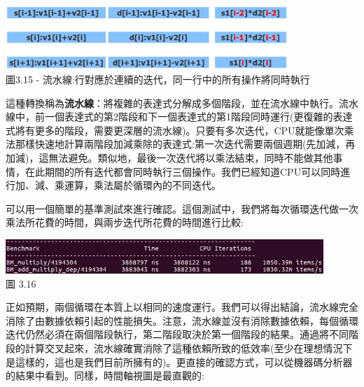 \begin{center}
\includegraphics[width=0.8\textwidth]{content/1/chapter3/images/15.jpg}\\
圖3.15 - 流水線:行對應於連續的迭代，同一行中的所有操作將同時執行
\end{center}

這種轉換稱為\textbf{流水線}：將複雜的表達式分解成多個階段，並在流水線中執行。流水線中，前一個表達式的第2階段和下一個表達式的第1階段同時運行(更復雜的表達式將有更多的階段，需要更深層的流水線)。只要有多次迭代，CPU就能像單次乘法那樣快速地計算兩階段加減乘除的表達式:第一次迭代需要兩個週期(先加減，再加減)，這無法避免。類似地，最後一次迭代將以乘法結束，同時不能做其他事情，在此期間的所有迭代都會同時執行三個操作。我們已經知道CPU可以同時進行加、減、乘運算，乘法屬於循環內的不同迭代。

可以用一個簡單的基準測試來進行確認。這個測試中，我們將每次循環迭代做一次乘法所花費的時間，與兩步迭代所花費的時間進行比較:

\begin{center}
\includegraphics[width=0.9\textwidth]{content/1/chapter3/images/16.jpg}\\
圖 3.16
\end{center}

正如預期，兩個循環在本質上以相同的速度運行。我們可以得出結論，流水線完全消除了由數據依賴引起的性能損失。注意，流水線並沒有消除數據依賴，每個循環迭代仍然必須在兩個階段執行，第二階段取決於第一個階段的結果。通過將不同階段的計算交叉起來，流水線確實消除了這種依賴所致的低效率(至少在理想情況下是這樣的，這也是我們目前所擁有的)。更直接的確認方式，可以從機器碼分析器的結果中看到。同樣，時間軸視圖是最直觀的:

